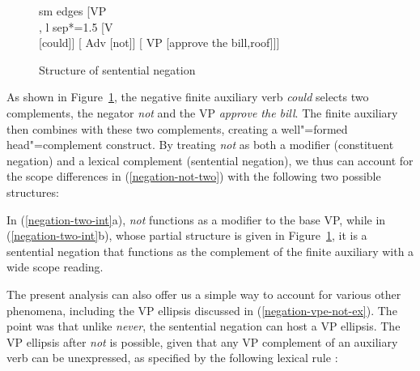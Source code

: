 \documentclass[output=paper
                ,modfonts
                ,nonflat
	        ,collection
	        ,collectionchapter
	        ,collectiontoclongg
 	        ,biblatex
                ,babelshorthands
                ,newtxmath
                ,draftmode
                ,colorlinks, citecolor=brown
]{./langsci/langscibook}
\begin{document}
{\begin{exe}
\begin{xlist}
\begin{exe}
\begin{xlist}
\begin{figure}
	\begin{forest}
		sm edges
		[VP\\
		, l sep*=1.5
			[V\\
				[could]]
			[ Adv
				[not]]
			[ VP
				[approve the bill,roof]]]
	\end{forest}
\caption{Structure of sentential negation}\label{negation-fig:6}
\end{figure}

As shown in Figure~\ref{negation-fig:6}, the negative finite auxiliary verb \textit{could} selects two complements, the negator
\textit{not} and the VP \textit{approve the bill}. The finite auxiliary then
combines with these two complements, creating a well"=formed head"=complement construct.
By treating \textit{not} as both a modifier (constituent negation)
and a lexical complement (sentential negation), we thus can
account for the scope differences in (\ref{negation-not-two}) with the
following two possible structures:

\eal
\label{negation-two-int}
\zl
%
In (\ref{negation-two-int}a), \textit{not} functions as a modifier to
the base VP, while  in (\ref{negation-two-int}b), whose partial structure is
given in Figure~\ref{negation-fig:6}, it is a sentential
negation that functions as the complement of the finite auxiliary
with a wide scope reading.

The present analysis can also offer us
a simple way to account for various other phenomena,
including the VP ellipsis discussed in (\ref{negation-vpe-not-ex}). The point
was that unlike \textit{never}, the sentential negation can
host a VP ellipsis.  The VP ellipsis after \textit{not} is
possible, given that any VP complement of an auxiliary
verb can be unexpressed, as
specified by the following lexical rule \citep{Kim:00}:



\end{xlist}
\end{exe}
\end{xlist}
\end{exe}}
\end{document}
